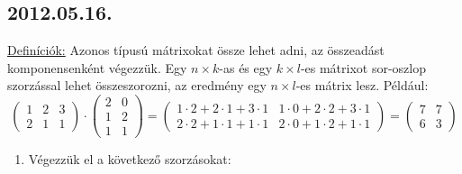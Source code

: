 \subsection*{2012.05.16.}
\underline{Definíciók:} Azonos típusú mátrixokat össze lehet adni, az összeadást komponensenként végezzük. Egy $n\times k$-as és egy $k\times l$-es mátrixot sor-oszlop szorzással lehet összeszorozni, az eredmény egy $n\times l$-es mátrix lesz. Például:
$$
\begin{pmatrix}
1&2&3\\
2&1&1
\end{pmatrix}\cdot
\begin{pmatrix}
2&0\\
1&2\\
1&1
\end{pmatrix}=
\begin{pmatrix}
1\cdot 2+2\cdot 1+3\cdot 1& 1\cdot 0+2\cdot 2+3\cdot 1\\
2\cdot 2+1\cdot 1+1\cdot 1& 2\cdot 0+1\cdot 2+1\cdot 1
\end{pmatrix}=
\begin{pmatrix}
7&7\\
6&3
\end{pmatrix}
$$
\begin{enumerate}
\item Végezzük el a következő szorzásokat:
\end{enumerate}


